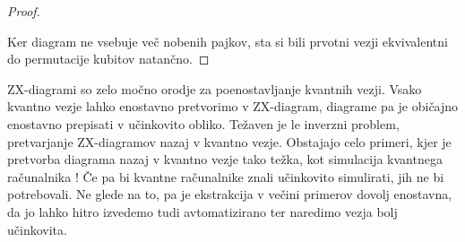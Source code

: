 \documentclass[mat1]{fmfdelo}
\begin{document}
\begin{proof}
    \begin{center}
    \end{center}
    Ker diagram ne vsebuje več nobenih pajkov, sta si bili prvotni vezji ekvivalentni do permutacije kubitov natančno.
\end{proof}
ZX-diagrami so zelo močno orodje za poenostavljanje kvantnih vezji. Vsako kvantno vezje lahko enostavno pretvorimo v ZX-diagram, diagrame pa je običajno enostavno prepisati v učinkovito obliko. Težaven je le inverzni problem, pretvarjanje ZX-diagramov nazaj v kvantno vezje. Obstajajo celo primeri, kjer je pretvorba diagrama nazaj v kvantno vezje tako težka, kot simulacija kvantnega računalnika \cite{Niel}! Če pa bi kvantne računalnike znali učinkovito simulirati, jih ne bi potrebovali. Ne glede na to, pa je ekstrakcija v večini primerov dovolj enostavna, da jo lahko hitro izvedemo tudi avtomatizirano ter naredimo vezja bolj učinkovita.
\end{document}
